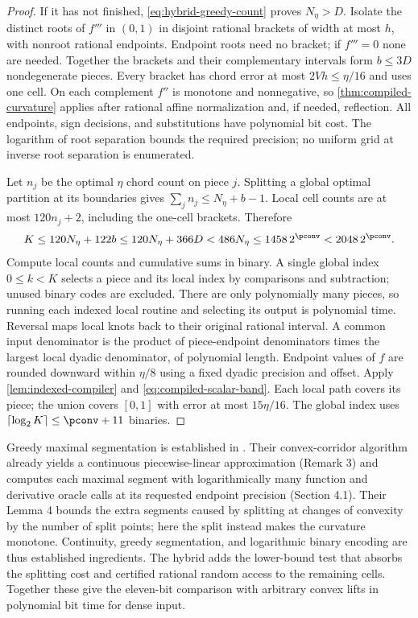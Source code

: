 \begin{proof}
If it has not finished, \eqref{eq:hybrid-greedy-count} proves
$N_\eta>D$. Isolate the distinct roots of $f'''$ in $(0,1)$ in
disjoint rational brackets of width at most $h$, with nonroot rational
endpoints. Endpoint roots need no bracket; if $f'''=0$ none are needed.
Together the brackets and their complementary intervals form
$b\le3D$ nondegenerate pieces. Every bracket has chord error at most
$2Vh\le\eta/16$ and uses one cell. On each complement $f''$ is
monotone and nonnegative, so \cref{thm:compiled-curvature} applies
after rational affine normalization and, if needed, reflection.
All endpoints, sign decisions, and substitutions have polynomial bit
cost. The logarithm of root separation bounds the required precision;
no uniform grid at inverse root separation is enumerated.

Let $n_j$ be the optimal $\eta$ chord count on piece $j$. Splitting
a global optimal partition at its boundaries gives
$\sum_jn_j\le N_\eta+b-1$. Local cell counts are at most
$120n_j+2$, including the one-cell brackets. Therefore
\begin{equation}\label{eq:hybrid-total-cells}
 K\le120N_\eta+122b\le120N_\eta+366D
 <486N_\eta\le1458\,2^{\pconv}<2048\,2^{\pconv}.
\end{equation}
Compute local counts and cumulative sums in binary. A single global
index $0\le k<K$ selects a piece and its local index by comparisons
and subtraction; unused binary codes are excluded. There are only
polynomially many pieces, so running each indexed local routine and
selecting its output is polynomial time. Reversal maps local knots
back to their original rational interval. A common input denominator
is the product of piece-endpoint denominators times the largest local
dyadic denominator, of polynomial length. Endpoint values of $f$ are
rounded downward within $\eta/8$ using a fixed dyadic precision and
offset. Apply \cref{lem:indexed-compiler} and
\eqref{eq:compiled-scalar-band}. Each local path covers its piece;
the union covers $[0,1]$ with error at most $15\eta/16$.
The global index uses $\lceil\log_2K\rceil\le\pconv+11$ binaries.
\end{proof}

Greedy maximal segmentation is established in
\citet[Proposition 1 and Corollary 1]{codsi2025}. Their convex-corridor
algorithm already yields a continuous piecewise-linear approximation
(Remark 3) and computes each maximal segment with logarithmically
many function and derivative oracle calls at its requested endpoint
precision (Section 4.1). Their Lemma 4 bounds the extra segments caused
by splitting at changes of convexity by the number of split points;
here the split instead makes the curvature monotone. Continuity, greedy
segmentation, and logarithmic binary encoding are thus established
ingredients. The hybrid adds the lower-bound test that absorbs the
splitting cost and certified rational random access to the remaining
cells. Together these give the eleven-bit comparison with arbitrary
convex lifts in polynomial bit time for dense input.

